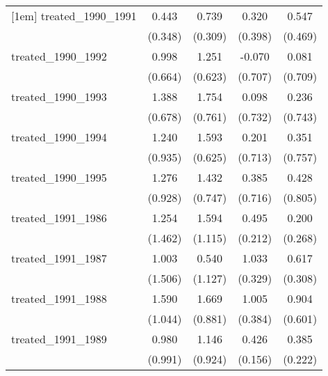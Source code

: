 {\begin{tabular}{l*{4}{c}}
[1em]
treated\_1990\_1991&       0.443         &       0.739\sym{*}  &       0.320         &       0.547         \\
            &     (0.348)         &     (0.309)         &     (0.398)         &     (0.469)         \\
[1em]
treated\_1990\_1992&       0.998         &       1.251\sym{*}  &      -0.070         &       0.081         \\
            &     (0.664)         &     (0.623)         &     (0.707)         &     (0.709)         \\
[1em]
treated\_1990\_1993&       1.388\sym{*}  &       1.754\sym{*}  &       0.098         &       0.236         \\
            &     (0.678)         &     (0.761)         &     (0.732)         &     (0.743)         \\
[1em]
treated\_1990\_1994&       1.240         &       1.593\sym{*}  &       0.201         &       0.351         \\
            &     (0.935)         &     (0.625)         &     (0.713)         &     (0.757)         \\
[1em]
treated\_1990\_1995&       1.276         &       1.432         &       0.385         &       0.428         \\
            &     (0.928)         &     (0.747)         &     (0.716)         &     (0.805)         \\
[1em]
treated\_1991\_1986&       1.254         &       1.594         &       0.495\sym{*}  &       0.200         \\
            &     (1.462)         &     (1.115)         &     (0.212)         &     (0.268)         \\
[1em]
treated\_1991\_1987&       1.003         &       0.540         &       1.033\sym{**} &       0.617\sym{*}  \\
            &     (1.506)         &     (1.127)         &     (0.329)         &     (0.308)         \\
[1em]
treated\_1991\_1988&       1.590         &       1.669         &       1.005\sym{**} &       0.904         \\
            &     (1.044)         &     (0.881)         &     (0.384)         &     (0.601)         \\
[1em]
treated\_1991\_1989&       0.980         &       1.146         &       0.426\sym{**} &       0.385         \\
            &     (0.991)         &     (0.924)         &     (0.156)         &     (0.222)         \\

\end{tabular}}
